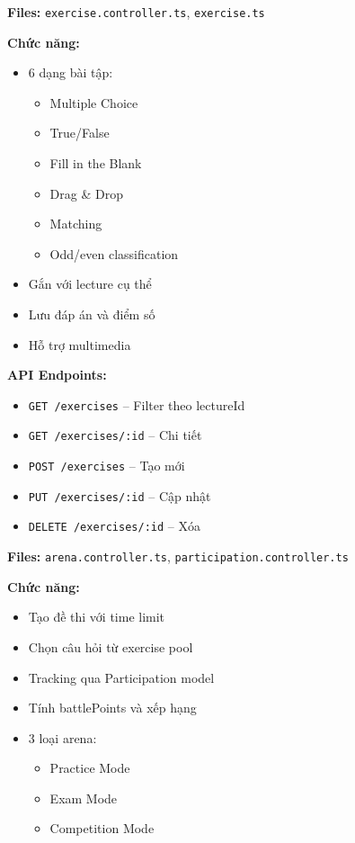 \textbf{Files:} \texttt{exercise.controller.ts}, \texttt{exercise.ts}

\textbf{Chức năng:}
\begin{itemize}
\item 6 dạng bài tập:
  \begin{itemize}
  \item Multiple Choice
  \item True/False
  \item Fill in the Blank
  \item Drag \& Drop
  \item Matching
  \item Odd/even classification
  \end{itemize}
\item Gắn với lecture cụ thể
\item Lưu đáp án và điểm số
\item Hỗ trợ multimedia
\end{itemize}

\textbf{API Endpoints:}
\begin{itemize}
\item \texttt{GET /exercises} -- Filter theo lectureId
\item \texttt{GET /exercises/:id} -- Chi tiết
\item \texttt{POST /exercises} -- Tạo mới
\item \texttt{PUT /exercises/:id} -- Cập nhật
\item \texttt{DELETE /exercises/:id} -- Xóa
\end{itemize}


\textbf{Files:} \texttt{arena.controller.ts}, \texttt{participation.controller.ts}

\textbf{Chức năng:}
\begin{itemize}
\item Tạo đề thi với time limit
\item Chọn câu hỏi từ exercise pool
\item Tracking qua Participation model
\item Tính battlePoints và xếp hạng
\item 3 loại arena:
  \begin{itemize}
  \item Practice Mode
  \item Exam Mode
  \item Competition Mode
  \end{itemize}
\end{itemize}

